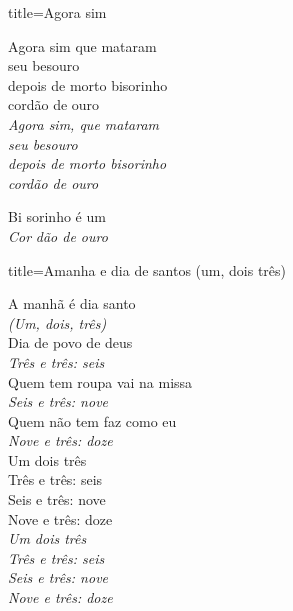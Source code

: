\documentclass[fontsize=14pt, paper=a4, twoside, DIV=20]{scrreprt} %
\begin{document}
\begin{multicols*}{2}
\begin{song}{title={Agora sim}}

\begin{verse*}
Agora sim que mataram\\
seu besouro\\
depois de morto bisorinho\\
cordão de ouro\\
\textit{Agora sim, que mataram}\\
\textit{seu besouro}\\
\textit{depois de morto bisorinho}\\
\textit{cordão de ouro}\\
\end{verse*}

\begin{verse*}
Bi sorinho é um\\
\textit{Cor} \textit{dão de ouro}\\
\end{verse*}

\end{song}

\begin{song}{title={Amanha e dia de santos (um, dois três)}}

    \begin{verse*}
        A manhã é dia santo\\
         \textit{(Um, dois, três)}\\
        Dia de povo de deus\\
\textit{Três e três: seis}\\
Quem tem roupa vai na missa\\
\textit{Seis e três: nove}\\
Quem não tem faz como eu\\
\textit{Nove e três: doze}\\

Um dois três\\
Três e três: seis\\
Seis e três: nove\\
Nove e três: doze\\
\textit{Um dois três}\\
\textit{Três e três: seis}\\
\textit{Seis e três: nove}\\
\textit{Nove e três: doze}\\


\end{verse*}
\end{song}


\end{multicols*}
\end{document}
